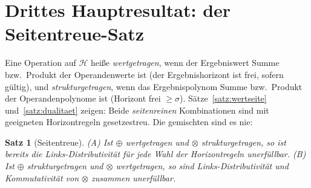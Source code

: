 \documentclass[11pt]{article}
\newtheorem{satz}{Satz}[section]
\theoremstyle{definition}
\theoremstyle{remark}
\newcommand{\Hori}{\mathcal H}
\begin{document}
\section{Drittes Hauptresultat: der Seitentreue-Satz}

Eine Operation auf $\Hori$ heiße \emph{wertgetragen}, wenn der
Ergebniswert Summe bzw.\ Produkt der Operandenwerte ist (der
Ergebnishorizont ist frei, sofern gültig), und
\emph{strukturgetragen}, wenn das Ergebnispolynom Summe bzw.\
Produkt der Operandenpolynome ist (Horizont frei $\ge\sigma$).
Sätze~\ref{satz:wertseite} und~\ref{satz:dualitaet} zeigen: Beide
\emph{seitenreinen} Kombinationen sind mit geeigneten Horizontregeln
gesetzestreu. Die gemischten sind es nie:

\begin{satz}[Seitentreue]\label{satz:seitentreue}
\emph{(A)} Ist $\oplus$ wertgetragen und $\otimes$ strukturgetragen,
so ist bereits die Links-Distributivität für jede Wahl der
Horizontregeln unerfüllbar.
\emph{(B)} Ist $\oplus$ strukturgetragen und $\otimes$ wertgetragen,
so sind Links-Distributivität und Kommutativität von $\otimes$
zusammen unerfüllbar.
\end{satz}
\end{document}
